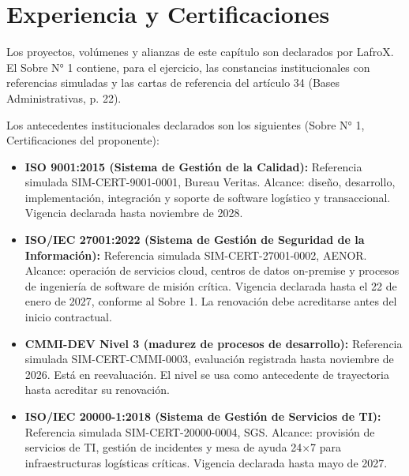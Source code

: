 \section{Experiencia y Certificaciones}

Los proyectos, volúmenes y alianzas de este capítulo son declarados por LafroX. El Sobre N° 1 contiene, para el ejercicio, las constancias institucionales con referencias simuladas y las cartas de referencia del artículo 34 (Bases Administrativas, p. 22).

Los antecedentes institucionales declarados son los siguientes (Sobre N° 1, Certificaciones del proponente):
\begin{itemize}
    \item \textbf{ISO 9001:2015 (Sistema de Gestión de la Calidad):} Referencia simulada SIM-CERT-9001-0001, Bureau Veritas. Alcance: diseño, desarrollo, implementación, integración y soporte de software logístico y transaccional. Vigencia declarada hasta noviembre de 2028.
    \item \textbf{ISO/IEC 27001:2022 (Sistema de Gestión de Seguridad de la Información):} Referencia simulada SIM-CERT-27001-0002, AENOR. Alcance: operación de servicios cloud, centros de datos on-premise y procesos de ingeniería de software de misión crítica. Vigencia declarada hasta el 22 de enero de 2027, conforme al Sobre 1. La renovación debe acreditarse antes del inicio contractual.
    \item \textbf{CMMI-DEV Nivel 3 (madurez de procesos de desarrollo):} Referencia simulada SIM-CERT-CMMI-0003, evaluación registrada hasta noviembre de 2026. Está en reevaluación. El nivel se usa como antecedente de trayectoria hasta acreditar su renovación.
    \item \textbf{ISO/IEC 20000-1:2018 (Sistema de Gestión de Servicios de TI):} Referencia simulada SIM-CERT-20000-0004, SGS. Alcance: provisión de servicios de TI, gestión de incidentes y mesa de ayuda 24$\times$7 para infraestructuras logísticas críticas. Vigencia declarada hasta mayo de 2027.
\end{itemize}

